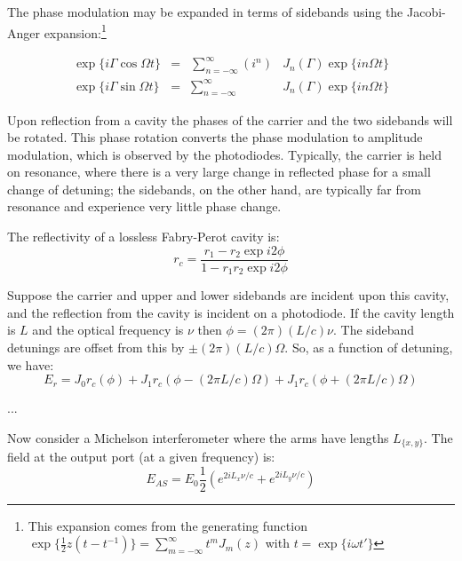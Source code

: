
The phase modulation may be expanded in terms of sidebands using the
Jacobi-Anger expansion:\footnote{This expansion comes from the 
generating function 
$\exp\{\frac{1}{2} z \left(t - t^{-1}\right)\} = \sum_{m=-\infty}^\infty t^m J_m(z)$ with $t = \exp \{i \omega t'\}$}

\begin{equation}
\begin{array}{rcll}
\exp\{i\Gamma\cos\Omega t\} & = &\sum_{n=-\infty}^{\infty} \left(i^n\right) & J_n(\Gamma) \exp\{i n \Omega t\} \\
\exp\{i\Gamma\sin\Omega t\} & = & \sum_{n=-\infty}^{\infty} & J_n(\Gamma) \exp\{i n \Omega t\}
\end{array}
\end{equation}

Upon reflection from a cavity the phases of the carrier and the two
sidebands will be rotated.  This phase rotation converts the phase
modulation to amplitude modulation, which is observed by the
photodiodes.  Typically, the carrier is held on resonance, where there
is a very large change in reflected phase for a small change of
detuning; the sidebands, on the other hand, are typically far from
resonance and experience very little phase change.

The reflectivity of a lossless Fabry-Perot cavity is:
\begin{equation}
r_c = \frac{r_1 - r_2 \exp i2\phi}{1 - r_1 r_2 \exp i 2\phi}
\end{equation}

Suppose the carrier and upper and lower sidebands are incident upon this
cavity, and the reflection from the cavity is incident on a photodiode.
If the cavity length is $L$ and the optical frequency is $\nu$ then
$\phi = (2\pi)(L/c)\nu$.  The sideband detunings are offset from this by
$\pm(2\pi)(L/c)\Omega$.  So, as a function of detuning, we have:
%
\begin{equation}
E_r = J_0 r_c(\phi) 
+ J_1 r_c(\phi - (2\pi L/c)\Omega) 
+ J_1 r_c(\phi + (2\pi L/c)\Omega)
\end{equation}

...

Now consider a Michelson interferometer where the arms have lengths
$L_{\{x,y\}}$.  The field at the output port (at a given frequency) is:
%
\begin{equation}
E_{AS} = E_0 \frac{1}{2} \left( e^{2 i L_{x} \nu /c} + e^{2 i L_{y} \nu / c} \right) 
\end{equation}

